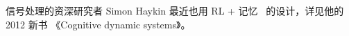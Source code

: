 \documentclass[orivec]{llncs}
\newcommand{\emp}[1]{\textbf{\textcolor{Cerulean}{#1}}}
\begin{document}
信号处理的资深研究者 Simon Haykin 最近也用 RL + 记忆~ 的设计，详见他的 2012 新书 《Cognitive dynamic systems》。 




\end{document}
